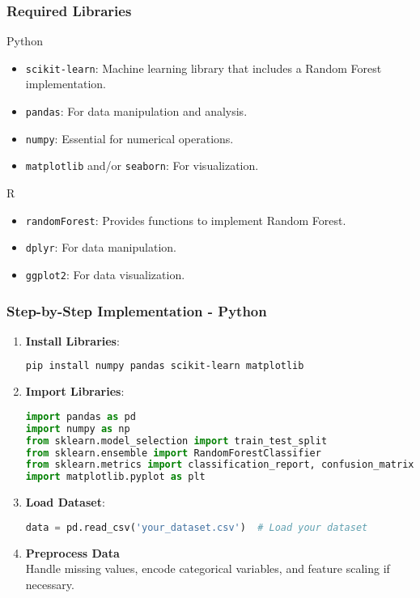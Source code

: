 \documentclass[aspectratio=169]{beamer}
\begin{document}
\begin{frame}
    \frametitle{Required Libraries}
    \begin{block}{Python}
        \begin{itemize}
            \item \texttt{scikit-learn}: Machine learning library that includes a Random Forest implementation.
            \item \texttt{pandas}: For data manipulation and analysis.
            \item \texttt{numpy}: Essential for numerical operations.
            \item \texttt{matplotlib} and/or \texttt{seaborn}: For visualization.
        \end{itemize}
    \end{block}
    \begin{block}{R}
        \begin{itemize}
            \item \texttt{randomForest}: Provides functions to implement Random Forest.
            \item \texttt{dplyr}: For data manipulation.
            \item \texttt{ggplot2}: For data visualization.
        \end{itemize}
    \end{block}
\end{frame}

\begin{frame}[fragile]
    \frametitle{Step-by-Step Implementation - Python}
    \begin{enumerate}
        \item \textbf{Install Libraries}:
            \begin{lstlisting}[language=bash]
pip install numpy pandas scikit-learn matplotlib
            \end{lstlisting}

        \item \textbf{Import Libraries}:
            \begin{lstlisting}[language=Python]
import pandas as pd
import numpy as np
from sklearn.model_selection import train_test_split
from sklearn.ensemble import RandomForestClassifier
from sklearn.metrics import classification_report, confusion_matrix
import matplotlib.pyplot as plt
            \end{lstlisting}

        \item \textbf{Load Dataset}:
            \begin{lstlisting}[language=Python]
data = pd.read_csv('your_dataset.csv')  # Load your dataset
            \end{lstlisting}

        \item \textbf{Preprocess Data} \\
        Handle missing values, encode categorical variables, and feature scaling if necessary.
    \end{enumerate}
\end{frame}
\end{document}
